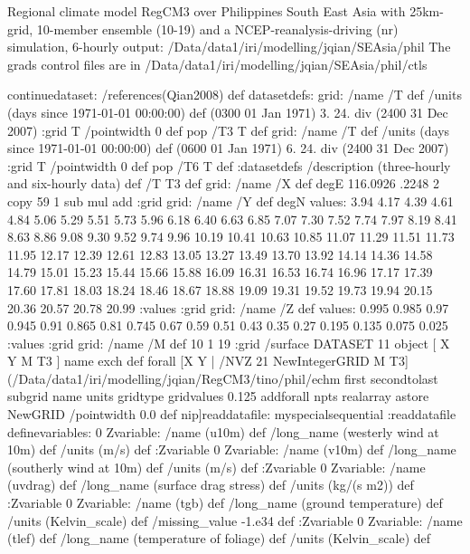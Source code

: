 Regional climate model RegCM3 over Philippines South East Asia  with 25km-grid, 10-member ensemble (10-19) and a NCEP-reanalysis-driving (nr) simulation, 6-hourly output:
/Data/data1/iri/modelling/jqian/SEAsia/phil
The grads control files are in /Data/data1/iri/modelling/jqian/SEAsia/phil/ctls
\begin{ingrid}
continuedataset:
/references(Qian2008) def
datasetdefs:
grid:
/name /T def
/units (days since  1971-01-01 00:00:00) def
(0300 01 Jan 1971)
3. 24. div
(2400 31 Dec 2007)
:grid
T /pointwidth 0 def pop
/T3 T def
grid:
/name /T def
/units (days since  1971-01-01 00:00:00) def
(0600 01 Jan 1971)
6. 24. div
(2400 31 Dec 2007)
:grid
T /pointwidth 0 def pop
/T6 T def
:datasetdefs
/description (three-hourly and six-hourly data) def
/T T3 def
grid:
/name /X def
degE
116.0926 .2248 2 copy 59 1 sub mul add
:grid
grid:
/name /Y def
degN
values:
3.94   4.17   4.39   4.61   4.84   5.06   5.29   5.51   5.73   5.96
   6.18   6.40   6.63   6.85   7.07   7.30   7.52   7.74   7.97   8.19
   8.41   8.63   8.86   9.08   9.30   9.52   9.74   9.96  10.19  10.41
  10.63  10.85  11.07  11.29  11.51  11.73  11.95  12.17  12.39  12.61
  12.83  13.05  13.27  13.49  13.70  13.92  14.14  14.36  14.58  14.79
  15.01  15.23  15.44  15.66  15.88  16.09  16.31  16.53  16.74  16.96
  17.17  17.39  17.60  17.81  18.03  18.24  18.46  18.67  18.88  19.09
  19.31  19.52  19.73  19.94  20.15  20.36  20.57  20.78  20.99
:values
:grid
grid:
/name /Z def
values:
0.995 0.985 0.97 0.945 0.91 0.865 0.81 0.745 0.67 0.59 0.51 0.43 0.35 0.27 0.195 0.135 0.075 0.025
:values
:grid
grid: 
/name /M def
10 1 19
:grid
/surface {
DATASET 11 object
[ X Y M T3 ] {  name exch def } forall
[X
    Y | 
/NVZ 21 NewIntegerGRID
    M T3] (/Data/data1/iri/modelling/jqian/RegCM3/tino/phil/echm%
        first secondtolast subgrid
        name units gridtype gridvalues
            {0.125 add}forall npts realarray astore
            NewGRID
         /pointwidth 0.0 def
         nip]readdatafile: 
myspecialsequential
:readdatafile
definevariables:
0 Zvariable: /name (u10m) def /long_name (westerly  wind at 10m)  def /units (m/s) def
:Zvariable
0 Zvariable: /name (v10m) def /long_name (southerly wind at 10m)  def /units (m/s) def
:Zvariable
0 Zvariable: /name (uvdrag) def /long_name (surface drag stress)  def /units (kg/(s m2)) def
:Zvariable
0 Zvariable: /name (tgb) def /long_name (ground temperature)  def /units (Kelvin_scale) def
/missing_value -1.e34 def
:Zvariable
0 Zvariable: /name (tlef) def /long_name (temperature of foliage)  def /units (Kelvin_scale) def
}
\end{ingrid}
